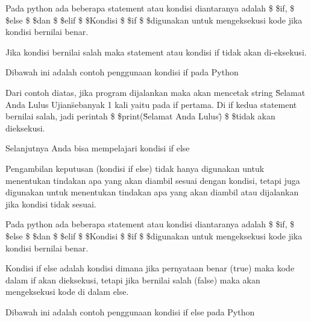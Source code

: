 \noindent 
\vspace{12pt}
\noindent 
Pada python ada beberapa statement atau kondisi diantaranya adalah \$  \$if, \$  \$else \$  \$dan \$  \$elif \$  \$Kondisi \$  \$if \$  \$digunakan untuk mengeksekusi kode jika kondisi bernilai benar. \par
\noindent 
\vspace{12pt}
\noindent 
Jika kondisi bernilai salah maka statement atau kondisi if tidak akan di-eksekusi. \par
\noindent 
\vspace{\baselineskip}
Dibawah ini adalah contoh penggunaan kondisi if pada Python \par
\noindent 
\vspace{\baselineskip}
Dari contoh diatas, jika program dijalankan maka akan mencetak string \"Selamat Anda Lulus Ujian\" sebanyak 1 kali yaitu pada if pertama. Di if kedua statement bernilai salah, jadi perintah \$  \$print(\"Selamat Anda Lulus\") \$  \$tidak akan dieksekusi. \par
\noindent 
\vspace{\baselineskip}
Selanjutnya Anda bisa mempelajari kondisi if else \par
\vspace{12pt}
\noindent 
Pengambilan keputusan (kondisi if else) tidak hanya digunakan untuk menentukan tindakan apa yang akan diambil sesuai dengan kondisi, tetapi juga digunakan untuk menentukan tindakan apa yang akan diambil atau dijalankan jika kondisi tidak sesuai.\vspace{\baselineskip}
\vspace{\baselineskip}
 \par
\noindent 
Pada python ada beberapa statement atau kondisi diantaranya adalah \$  \$if, \$  \$else \$  \$dan \$  \$elif \$  \$Kondisi \$  \$if \$  \$digunakan untuk mengeksekusi kode jika kondisi bernilai benar.\vspace{\baselineskip}
\vspace{\baselineskip}
 \par
\noindent 
Kondisi if else adalah kondisi dimana jika pernyataan benar (true) maka kode dalam if akan dieksekusi, tetapi jika bernilai salah (false) maka akan mengeksekusi kode di dalam else.\vspace{\baselineskip}
\vspace{\baselineskip}
 \par
\noindent 
Dibawah ini adalah contoh penggunaan kondisi if else pada Python \par
\vspace{12pt}
